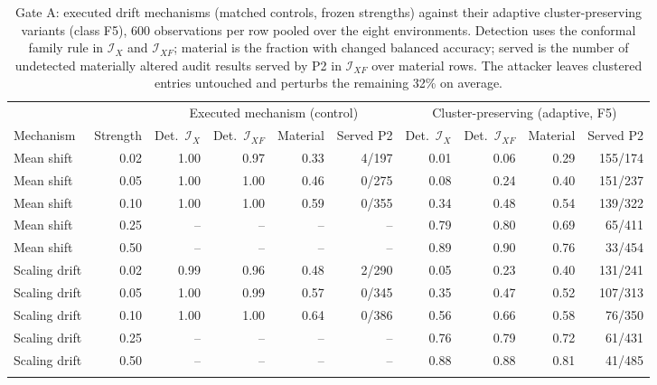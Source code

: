 \begin{table}[!tbp]
\caption{Gate A: executed drift mechanisms (matched controls, frozen strengths) against their adaptive cluster-preserving variants (class F5), 600 observations per row pooled over the eight environments. Detection uses the conformal family rule in $\mathcal I_X$ and $\mathcal I_{XF}$; material is the fraction with changed balanced accuracy; served is the number of undetected materially altered audit results served by P2 in $\mathcal I_{XF}$ over material rows. The attacker leaves clustered entries untouched and perturbs the remaining 32\% on average.}
\label{tab:adversarial}
\centering
\scriptsize
\setlength{\tabcolsep}{4pt}
\begin{tabular}{@{}lrrrrrrrrr@{}}
\toprule
 & & \multicolumn{4}{c}{Executed mechanism (control)} & \multicolumn{4}{c}{Cluster-preserving (adaptive, F5)} \\
\cmidrule(lr){3-6}\cmidrule(lr){7-10}
Mechanism & Strength & Det.\ $\mathcal I_X$ & Det.\ $\mathcal I_{XF}$ & Material & Served P2 & Det.\ $\mathcal I_X$ & Det.\ $\mathcal I_{XF}$ & Material & Served P2 \\
\midrule
Mean shift & 0.02 & 1.00 & 0.97 & 0.33 & 4/197 & 0.01 & 0.06 & 0.29 & 155/174 \\
Mean shift & 0.05 & 1.00 & 1.00 & 0.46 & 0/275 & 0.08 & 0.24 & 0.40 & 151/237 \\
Mean shift & 0.10 & 1.00 & 1.00 & 0.59 & 0/355 & 0.34 & 0.48 & 0.54 & 139/322 \\
Mean shift & 0.25 & -- & -- & -- & -- & 0.79 & 0.80 & 0.69 & 65/411 \\
Mean shift & 0.50 & -- & -- & -- & -- & 0.89 & 0.90 & 0.76 & 33/454 \\
\addlinespace[1pt]
Scaling drift & 0.02 & 0.99 & 0.96 & 0.48 & 2/290 & 0.05 & 0.23 & 0.40 & 131/241 \\
Scaling drift & 0.05 & 1.00 & 0.99 & 0.57 & 0/345 & 0.35 & 0.47 & 0.52 & 107/313 \\
Scaling drift & 0.10 & 1.00 & 1.00 & 0.64 & 0/386 & 0.56 & 0.66 & 0.58 & 76/350 \\
Scaling drift & 0.25 & -- & -- & -- & -- & 0.76 & 0.79 & 0.72 & 61/431 \\
Scaling drift & 0.50 & -- & -- & -- & -- & 0.88 & 0.88 & 0.81 & 41/485 \\
\addlinespace[1pt]
\bottomrule
\end{tabular}
\end{table}
